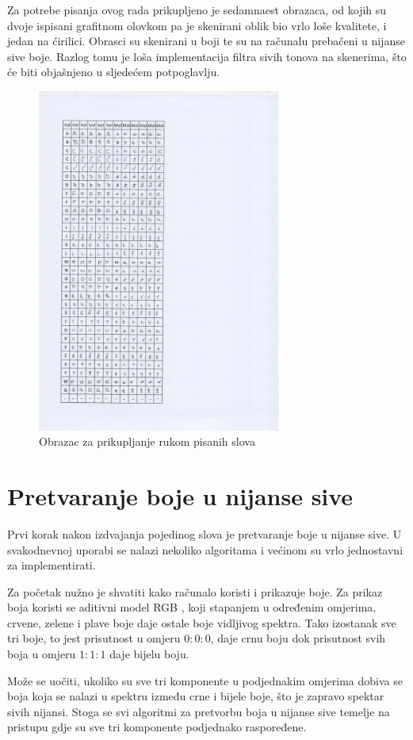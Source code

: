 Za potrebe pisanja ovog rada prikupljeno je sedamnaest obrazaca, od kojih su dvoje ispisani grafitnom olovkom pa je skenirani oblik bio vrlo loše kvalitete, i jedan na ćirilici. Obrasci su skenirani u boji te su na računalu prebačeni u nijanse sive boje. Razlog tomu je loša implementacija filtra sivih tonova na skenerima, što će biti objašnjeno u sljedećem potpoglavlju.
\begin{figure}[htb]
\centering
\includegraphics[width=8cm]{images/obrazac.png}
\caption{Obrazac za prikupljanje rukom pisanih slova}
\label{fig:obrazac}
\end{figure}

\section{Pretvaranje boje u nijanse sive}
Prvi korak nakon izdvajanja pojedinog slova je pretvaranje boje u nijanse sive. U svakodnevnoj uporabi se nalazi nekoliko algoritama \citep{grayscaleAlg} i većinom su vrlo jednostavni za implementirati.

Za početak nužno je shvatiti kako računalo koristi i prikazuje boje. Za prikaz boja koristi se aditivni model RGB , koji stapanjem u određenim omjerima, crvene, zelene i plave boje daje ostale boje vidljivog spektra. Tako izostanak sve tri boje, to jest prisutnost u omjeru $0:0:0$, daje crnu boju dok prisutnost svih boja u omjeru $1:1:1$ daje bijelu boju. 

Može se uočiti, ukoliko su sve tri komponente u podjednakim omjerima dobiva se boja koja se nalazi u spektru između crne i bijele boje, što je zapravo spektar sivih nijansi. Stoga se svi algoritmi za pretvorbu boja u nijanse sive temelje na pristupu gdje su sve tri komponente podjednako raspoređene.

